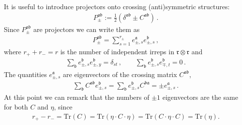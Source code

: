 \documentclass[12pt]{article}
\numberwithin{equation}{section}
\newcommand{\bea}{\begin{eqnarray}}
\newcommand{\eea}{\end{eqnarray}}
\newcommand{\mf}[1]{\mathfrak #1}
\begin{document}
	It is useful to introduce projectors onto crossing (anti)symmetric structures:
	\bea
	P_{\pm}^{\mf a \mf b}:= \frac 12 \left( \delta^{\mf a \mf b}\pm C^{\mf a \mf b}\right)\,.
	\eea
	Since $P_{\pm}^{\mf a \mf b}$ are projectors we can write them as
	\bea
	P_{\pm}^{\mf a \mf b}=\sum_{s=1}^{r_{\pm}} e_{\pm,s}^{\mf a} e_{\pm,s}^{\mf b}\,, \label{eq:proj}
	\eea
	where $r_++r_-=r$ is the number of independent irreps in $\mf r\otimes \mf r$ and
	\bea
	\sum_{\mf b}  e_{\pm,s}^{\mf b} e_{\pm,y}^{\mf b}=\delta_{st}\,, \qquad \sum_{\mf b}  e_{\pm,s}^{\mf b} e_{\mp,t}^{\mf b}=0\,.
	\eea
	The quantities $e^{\mf a}_{\pm,s}$ are eigenvectors of the crossing matrix $C^{\mf a \mf b}$,
	\bea
	\sum_{\mf b} C^{\mf a \mf b} e_{\pm, s}^{\mf b}= \sum_{\mf b}  e_{\pm, s}^{\mf b}C^{\mf b \mf a} =\pm e_{\pm, s}^{\mf a}\,.
	\eea
	At this point we can remark that the numbers of $\pm 1$ eigenvectors are the same for both $C$ and $\eta$, since
	\bea
	r_+-r_-=\mbox{Tr}( C )=\mbox{Tr}(\eta\cdot C \cdot \eta)=\mbox{Tr}(C \cdot \eta \cdot C)=\mbox{Tr}(\eta).
	\eea
	
\end{document}
